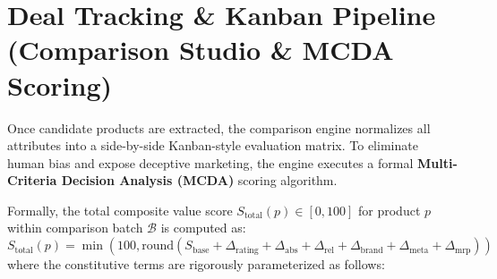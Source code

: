 \documentclass[12pt,a4paper,oneside]{report}
\begin{document}
\section{Deal Tracking \& Kanban Pipeline (Comparison Studio \& MCDA Scoring)}
Once candidate products are extracted, the comparison engine normalizes all attributes into a side-by-side Kanban-style evaluation matrix. To eliminate human bias and expose deceptive marketing, the engine executes a formal \textbf{Multi-Criteria Decision Analysis (MCDA)} scoring algorithm.

Formally, the total composite value score $S_{\text{total}}(p) \in [0, 100]$ for product $p$ within comparison batch $\mathcal{B}$ is computed as:
\begin{equation}
S_{\text{total}}(p) = \min\left(100, \text{round}\left(S_{\text{base}} + \Delta_{\text{rating}} + \Delta_{\text{abs}} + \Delta_{\text{rel}} + \Delta_{\text{brand}} + \Delta_{\text{meta}} + \Delta_{\text{mrp}}\right)\right)
\end{equation}
where the constitutive terms are rigorously parameterized as follows:
\end{document}
